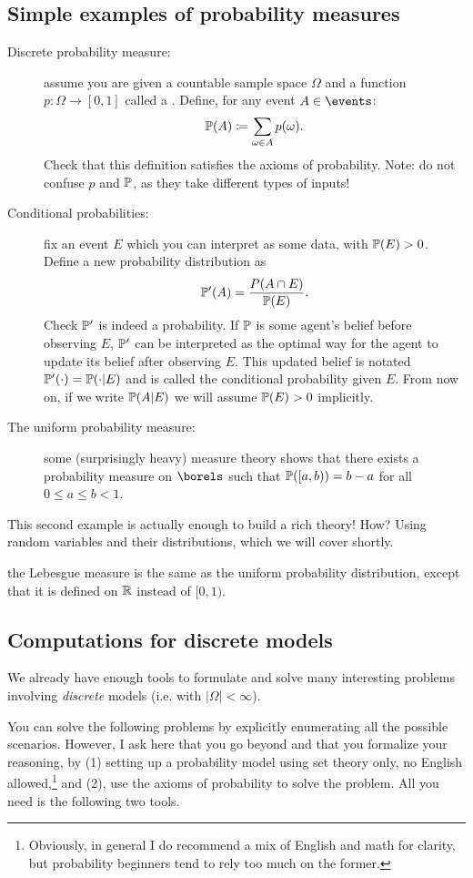 \documentclass{article}
\begin{document}
\subsection{Simple examples of probability measures}

\begin{description}
  \item[Discrete probability measure:] assume you are given a countable sample space $\Omega$ and a function $p: \Omega \to [0, 1]$ called a \PMF. Define, for any event $A \in \events$: \[ \P(A) \defeq \sum_{\omega \in A} p(\omega). \] Check that this definition satisfies the axioms of probability. Note: do not confuse $p$ and $\P$, as they take different types of inputs!
  \item[Conditional probabilities:] fix an event $E$ which you can interpret as some data, with $\P(E) > 0$. Define a new probability distribution as \[ \P'(A) = \frac{P(A \cap E)}{\P(E)}. \] Check $\P'$ is indeed a probability. If $\P$ is some agent's belief before observing $E$, $\P'$ can be interpreted as the optimal way for the agent to update its belief after observing $E$. This updated belief is notated $\P'(\cdot) = \P(\cdot | E)$ and is called the conditional probability given $E$. From now on, if we write $\P(A | E)$ we will assume $\P(E) > 0$ implicitly.
  \item[The uniform probability measure:] some (surprisingly heavy) measure theory shows that there exists a probability measure on $\borels$ such that $\P([a, b)) = b - a$ for all $0 \le a \le b < 1$.
\end{description}

This second example is actually enough to build a rich theory! How? Using random variables and their distributions, which we will cover shortly.


 the Lebesgue measure is the same as the uniform probability distribution, except that it is defined on $\R$ instead of $[0, 1)$. 


\subsection{Computations for discrete models}\label{sec:computation-discrete}

We already have enough tools to formulate and solve many interesting problems involving \emph{discrete} models (i.e. with $|\Omega| < \infty$). 

 You can solve the following problems by explicitly enumerating all the possible scenarios. However, I ask here that you go beyond and that you formalize your reasoning, by (1) setting up a probability model using set theory only, no English allowed,\footnote{Obviously, in general I do recommend a mix of English and math for clarity, but probability beginners tend to rely too much on the former.} and (2), use the axioms of probability to solve the problem. All you need is the following two tools.
\end{document}
